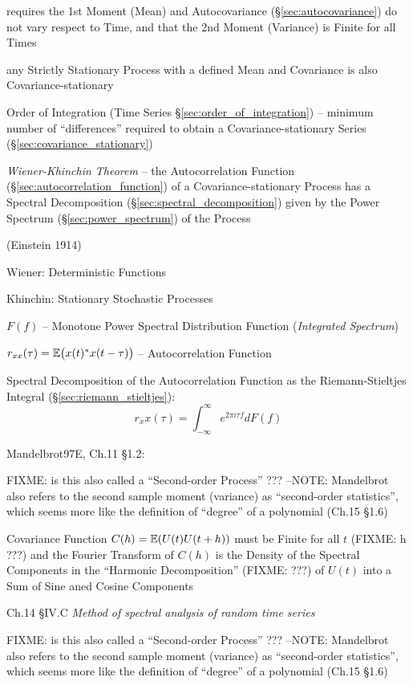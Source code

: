 requires the 1st Moment (Mean) and Autocovariance (\S\ref{sec:autocovariance})
do not vary respect to Time, and that the 2nd Moment (Variance) is Finite for
all Times

any Strictly Stationary Process with a defined Mean and Covariance is also
Covariance-stationary

\fist Order of Integration (Time Series \S\ref{sec:order_of_integration}) --
minimum number of ``differences'' required to obtain a Covariance-stationary
Series (\S\ref{sec:covariance_stationary})

\emph{Wiener-Khinchin Theorem} -- the Autocorrelation Function
(\S\ref{sec:autocorrelation_function}) of a Covariance-stationary Process has a
Spectral Decomposition (\S\ref{sec:spectral_decomposition}) given by the Power
Spectrum (\S\ref{sec:power_spectrum}) of the Process

(Einstein 1914)

Wiener: Deterministic Functions

Khinchin: Stationary Stochastic Processes

$F(f)$ -- Monotone Power Spectral Distribution Function
(\emph{Integrated Spectrum})

$r_{xx}(\tau) = \mathbb{E}\big(x(t)^* x(t - \tau)\big)$ -- Autocorrelation Function

Spectral Decomposition of the Autocorrelation Function as the Riemann-Stieltjes
Integral (\S\ref{sec:riemann_stieltjes}):
\[
  r_xx(\tau) = \int_{-\infty}^\infty e^{2\pi i\tau f} dF(f)
\]

Mandelbrot97E, Ch.11 \S 1.2:

FIXME: is this also called a ``Second-order Process'' ???
--NOTE: Mandelbrot also refers to the second sample moment (variance) as
``second-order statistics'', which seems more like the definition of ``degree''
of a polynomial (Ch.15 \S 1.6)

Covariance Function $C(h) = \mathbb{E}(U(t) U(t + h))$ must be Finite for all $t$
(FIXME: h ???) and the Fourier Transform of $C(h)$ is the Density of the
Spectral Components in the ``Harmonic Decomposition'' (FIXME: ???) of $U(t)$
into a Sum of Sine aned Cosine Components

Ch.14 \S IV.C \emph{Method of spectral analysis of random time series}

FIXME: is this also called a ``Second-order Process'' ???
--NOTE: Mandelbrot also refers to the second sample moment (variance) as
``second-order statistics'', which seems more like the definition of ``degree''
of a polynomial (Ch.15 \S 1.6)

